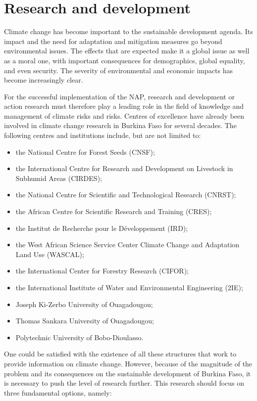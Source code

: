 \documentclass[
]{book}
\begin{document}
\section{Research and development}\label{research-and-development}

Climate change has become important to the sustainable development agenda. Its impact and the need for adaptation and mitigation measures go beyond environmental issues. The effects that are expected make it a global issue as well as a moral one, with important consequences for demographics, global equality, and even security. The severity of environmental and economic impacts has become increasingly clear.

For the successful implementation of the NAP, research and development or action research must therefore play a leading role in the field of knowledge and management of climate risks and risks. Centres of excellence have already been involved in climate change research in Burkina Faso for several decades. The following centres and institutions include, but are not limited to:

\begin{itemize}
\item
  the National Centre for Forest Seeds (CNSF);
\item
  the International Centre for Research and Development on Livestock in Subhumid Areas (CIRDES);
\item
  the National Centre for Scientific and Technological Research (CNRST);
\item
  the African Centre for Scientific Research and Training (CRES);
\item
  the Institut de Recherche pour le Développement (IRD);
\item
  the West African Science Service Center Climate Change and Adaptation Land Use (WASCAL);
\item
  the International Center for Forestry Research (CIFOR);
\item
  the International Institute of Water and Environmental Engineering (2IE);
\item
  Joseph Ki-Zerbo University of Ouagadougou;
\item
  Thomas Sankara University of Ouagadougou;
\item
  Polytechnic University of Bobo-Dioulasso.
\end{itemize}

One could be satisfied with the existence of all these structures that work to provide information on climate change. However, because of the magnitude of the problem and its consequences on the sustainable development of Burkina Faso, it is necessary to push the level of research further. This research should focus on three fundamental options, namely:
\end{document}
